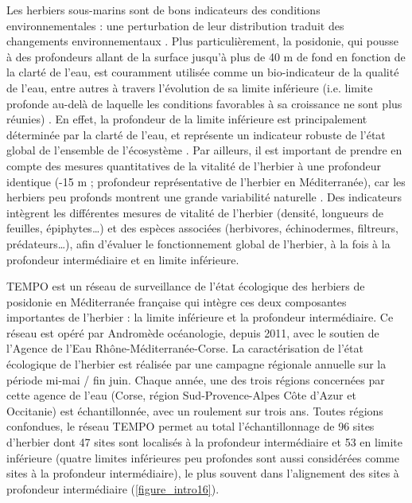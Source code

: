 Les herbiers sous-marins sont de bons indicateurs des conditions environnementales : une perturbation de leur distribution traduit des changements environnementaux \citep{orth_global_2006}. Plus particulièrement, la posidonie, qui pousse à des profondeurs allant de la surface jusqu’à plus de 40 m de fond en fonction de la clarté de l’eau, est couramment utilisée comme un bio-indicateur de la qualité de l’eau, entre autres à travers l’évolution de sa limite inférieure (i.e. limite profonde au-delà de laquelle les conditions favorables à sa croissance ne sont plus réunies) \citep{boudouresque_regression_2009, ruiz_mediterranean_2009}. En effet, la profondeur de la limite inférieure est principalement déterminée par la clarté de l’eau, et représente un indicateur robuste de l’état global de l’ensemble de l’écosystème \citep{borum_european_2004}. Par ailleurs, il est important de prendre en compte des mesures quantitatives de la vitalité de l’herbier à une profondeur identique (-15 m ; profondeur représentative de l’herbier en Méditerranée), car les herbiers peu profonds montrent une grande variabilité naturelle \citep{marba_interannual_1997, balestri_spatial_2003}. Des indicateurs intègrent les différentes mesures de vitalité de l’herbier (densité, longueurs de feuilles, épiphytes…) et des espèces associées (herbivores, échinodermes, filtreurs, prédateurs…), afin d’évaluer le fonctionnement global de l’herbier, à la fois à la profondeur intermédiaire et en limite inférieure.

TEMPO est un réseau de surveillance de l’état écologique des herbiers de posidonie en Méditerranée française qui intègre ces deux composantes importantes de l’herbier : la limite inférieure et la profondeur intermédiaire. Ce réseau est opéré par Andromède océanologie, depuis 2011, avec le soutien de l’Agence de l’Eau Rhône-Méditerranée-Corse. La caractérisation de l’état écologique de l’herbier est réalisée par une campagne régionale annuelle sur la période mi-mai / fin juin. Chaque année, une des trois régions concernées par cette agence de l’eau (Corse, région Sud-Provence-Alpes Côte d’Azur et Occitanie) est échantillonnée, avec un roulement sur trois ans. Toutes régions confondues, le réseau TEMPO permet au total l’échantillonnage de 96 sites d’herbier dont 47 sites sont localisés à la profondeur intermédiaire et 53 en limite inférieure (quatre limites inférieures peu profondes sont aussi considérées comme sites à la profondeur intermédiaire), le plus souvent dans l’alignement des sites à profondeur intermédiaire (\autoref{figure_intro16}). 

